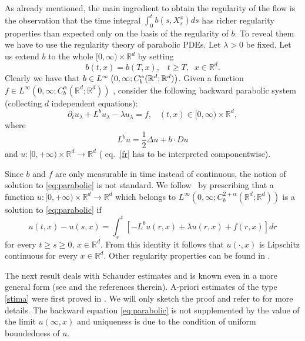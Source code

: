 \documentclass[a4paper,11pt]{article}
\begin{document}
As already mentioned, the main ingredient to obtain the regularity of the
flow is the observation that the time integral $\int_{0}^{t}b\left(
s,X_{s}^{x}\right) ds$ has richer regularity properties than expected only
on the basis of the regularity of $b$. To reveal them we have to use the
regularity theory of parabolic PDEs. Let $\lambda >0$ be fixed. Let us
extend $b$ to the whole $[0,\infty )\times {\mathbb{R}}^{d}$ by setting
\begin{equation}
b(t,x)=b(T,x),\;\;\;t\geq T,\;\;x\in {\mathbb{R}}^{d}.  \label{bb}
\end{equation}
Clearly we have that $b\in L^{\infty }\left( 0,\infty ;C_{b}^{\alpha }({%
\mathbb{R}}^{d};{\mathbb{R}}^{d})\right) $. Given a function $f\in L^{\infty
}\left( 0,\infty ;C_{b}^{\alpha }({\mathbb{R}}^{d};{\mathbb{R}}^{d})\right) $%
, consider the following backward parabolic system (collecting $d$
independent equations):
\begin{equation}
\partial _{t}u_{\lambda }+L^{b}u_{\lambda }-\lambda u_{\lambda
}=f,\;\;\;(t,x)\in \lbrack 0,\infty )\times {\mathbb{R}}^{d},
\label{eq:parabolic}
\end{equation}
where
\begin{equation}
L^{b}u=\frac{1}{2}\Delta u+b\cdot Du  \label{fr}
\end{equation}
and $u:[0,+\infty )\times {\mathbb{R}}^{d}\rightarrow {\mathbb{R}}^{d}$ (%
eq.~\eqref{fr} has to be interpreted componentwise).

Since $b$ and $f$ are only measurable in time instead of continuous, the
notion of solution to \eqref{eq:parabolic} is not standard. We follow~\cite{KP} by prescribing that a function $u:[0,+\infty )\times {\mathbb{R}%
}^{d}\rightarrow {\mathbb{R}}^{d}$ which belongs to $L^{\infty }\left(
0,\infty ;C_{b}^{2+\alpha }({\mathbb{R}}^{d};{\mathbb{R}}^{d})\right) $ is a
solution to \eqref{eq:parabolic} if
\begin{equation*}
u(t,x)-u(s,x)=\int_{s}^{t}[-L^{b}u(r,x)+\lambda u(r,x)+f(r,x)]dr
\end{equation*}
for every $t\geq s\geq 0$, $x\in {\mathbb{R}}^{d}$. From this identity it
follows that $u\left( \cdot ,x\right) $ is Lipschitz continuous for every $%
x\in {\mathbb{R}}^{d}$.
Other regularity properties can be found in \cite{KP}.

\smallskip The next result deals with Schauder estimates and is known even
in a more general form (see \cite{KP} and the references therein). A-priori
estimates of the type \eqref{stima} were first proved in \cite{Br}. We will
only sketch the proof and refer to \cite{KP} for more details. The backward
equation \eqref{eq:parabolic} is not supplemented by the value of the limit $%
u\left( \infty ,x\right) $ and uniqueness is due to the condition of uniform
boundedness of $u$. %
\end{document}
